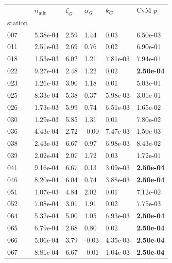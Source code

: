 \begin{figure}[htbp!]
    \centering
    {\footnotesize
    \begin{minipage}[t]{0.48\linewidth}
        \centering
        \begin{tabular}{llllll}
        \toprule
         & $n_{\min}$ & $\zeta_G$ & $\alpha_G$ & $k_G$ & CvM $p$ \\
        station &  &  &  &  &  \\
        \midrule
                    007 & 5.38e-04 & 2.59 & 1.44 & 0.03 & 6.50e-03\\
                    011 & 2.51e-03 & 2.69 & 0.76 & 0.02 & 6.90e-01\\
                    018 & 1.53e-03 & 6.02 & 1.21 & 7.81e-03 & 7.94e-01\\
                    022 & 9.27e-04 & 2.48 & 1.22 & 0.02 & \textbf{2.50e-04}\\
                    023 & 1.26e-03 & 3.90 & 1.18 & 0.01 & 5.03e-01\\
                    025 & 8.33e-04 & 5.38 & 0.37 & 5.98e-03 & 3.01e-01\\
                    026 & 1.73e-03 & 5.99 & 0.74 & 6.51e-03 & 1.65e-02\\
                    030 & 1.29e-03 & 5.85 & 1.31 & 0.01 & 7.80e-02\\
                    036 & 4.43e-04 & 2.72 & -0.00 & 7.47e-03 & 1.50e-03\\
                    038 & 2.43e-03 & 6.67 & 0.97 & 6.98e-03 & 8.43e-02\\
                    039 & 2.02e-04 & 2.07 & 1.72 & 0.03 & 1.72e-01\\
                    041 & 9.16e-04 & 6.67 & 0.13 & 3.09e-03 & \textbf{2.50e-04}\\
                    046 & 8.20e-04 & 6.04 & 0.74 & 3.88e-03 & \textbf{2.50e-04}\\
                    051 & 1.07e-03 & 4.84 & 2.02 & 0.01 & 7.12e-02\\
                    052 & 7.08e-04 & 3.01 & 1.91 & 0.02 & 7.75e-03\\
                    064 & 5.32e-04 & 5.00 & 1.05 & 6.93e-03 & \textbf{2.50e-04}\\
                    065 & 6.79e-04 & 2.68 & 0.80 & 0.02 & \textbf{2.50e-04}\\
                    066 & 5.06e-04 & 3.79 & -0.03 & 4.35e-03 & \textbf{2.50e-04}\\
                    067 & 8.81e-04 & 6.67 & -0.01 & 1.04e-03 & \textbf{2.50e-04}\\

\end{tabular}
\end{minipage}}
\end{figure}

